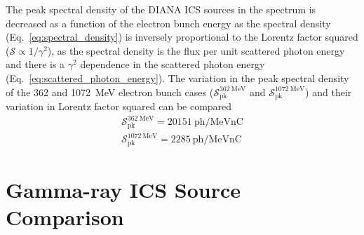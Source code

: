 \documentclass[../main.tex]{subfiles}
\begin{document}
The peak spectral density of the DIANA ICS sources in the spectrum is decreased as a function of the electron bunch energy as the spectral density (Eq.~\ref{eq:spectral_density}) is inversely proportional to the Lorentz factor squared ($\mathcal{S} \propto 1/\gamma^{2}$), as the spectral density is the flux per unit scattered photon energy and there is a $\gamma^{2}$ dependence in the scattered photon energy (Eq.~\ref{eq:scattered_photon_energy}). The variation in the peak spectral density of the 362 and 1072~\si{\mega\electronvolt} electron bunch cases ($\mathcal{S}_{\mathrm{pk}}^{362~\si{\mega\electronvolt}}$ and $\mathcal{S}_{\mathrm{pk}}^{1072~\si{\mega\electronvolt}}$) and their variation in Lorentz factor squared can be compared
\begin{align}
\mathcal{S}_{\mathrm{pk}}^{362~\si{\mega\electronvolt}} = 20151~\mathrm{ph}/\si{\mega\electronvolt\nano\coulomb} \\ \mathcal{S}_{\mathrm{pk}}^{1072~\si{\mega\electronvolt}}=2285~\mathrm{ph}/\si{\mega\electronvolt\nano\coulomb}
\end{align}

\section{Gamma-ray ICS Source Comparison}
\label{sec:gamma_ICS_comparison}
\end{document}
